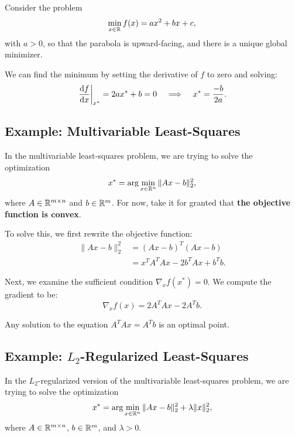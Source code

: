 \documentclass[12pt]{article}
\begin{document}
Consider the problem
%
\begin{equation*}
\min_{x \in { {\mathbb R}^{} }} f(x) = ax^2 + bx + c,
\end{equation*}
%
with $a > 0$, so that the parabola is upward-facing, and there is a unique global minimizer. 

We can find the minimum by setting the derivative of $f$ to zero and solving:
%
\begin{equation*}
\left.\frac{{\mathrm d} {f}}{{\mathrm d} {x}}\right|_{x^*} = 2ax^* + b = 0 \;\;\; \implies \;\;\; x^* = \frac{-b}{2a}. 
\end{equation*}


\subsection{Example: Multivariable Least-Squares}

In the multivariable least-squares problem, we are trying to solve the optimization
%
\begin{equation*}
x^* = \arg\min_{x \in { {\mathbb R}^{n} }} \|Ax - b\|_2^2,
\end{equation*}
%
where $A \in { {\mathbb R}^{m \times n} }$ and $b \in { {\mathbb R}^{m} }$. For now, take it for granted that \textbf{the objective function is convex}. 


To solve this, we first rewrite the objective function:
%
\begin{align*}
\|Ax - b \|_2^2 &= (Ax-b)^T (Ax -b) \\
&= x^T A^T A x - 2 b^T A x + b^T b.
\end{align*}

Next, we examine the sufficient condition $\nabla_x f(x^*) = 0$. We compute the gradient to be:
%
\begin{equation*}
\nabla_x f(x) = 2 A^T A x - 2 A^T b.
\end{equation*}

Any solution to the equation $A^TA x = A^T b$ is an optimal point.

\subsection{Example: $L_2$-Regularized Least-Squares}

In the $L_2$-regularized version of the multivariable least-squares problem, we are trying to solve the optimization
%
\begin{equation*}
x^* = \arg\min_{x \in { {\mathbb R}^{n} }} \|Ax - b\|_2^2 + \lambda \|x\|_2^2,
\end{equation*}
%
where $A \in { {\mathbb R}^{m \times n} }$, $b \in { {\mathbb R}^{m} }$, and $\lambda > 0$. 
\end{document}
